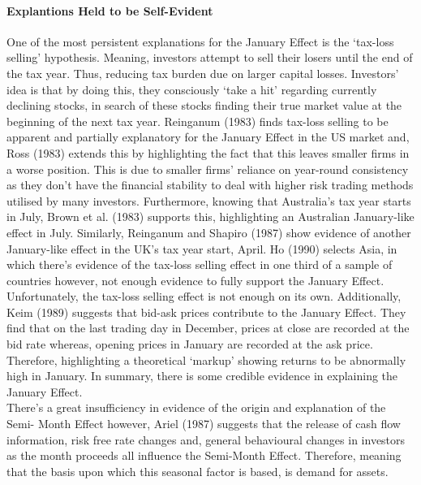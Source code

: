 \documentclass[11pt, english]{article}
\begin{document}
			\paragraph{Explantions Held to be Self-Evident}

			One of the most persistent explanations for the January Effect is the `tax-loss selling' hypothesis. Meaning, investors attempt to sell their losers until the end of the tax year. Thus, reducing tax burden due on larger capital losses. Investors' idea is that by doing this, they consciously `take a hit' regarding currently declining stocks, in search of these stocks finding their true market value at the beginning of the next tax year. Reinganum (1983) finds tax-loss selling to be apparent and partially explanatory for the January Effect in the US market and, Ross (1983) extends this by highlighting the fact that this leaves smaller firms in a worse position. This is due to smaller firms' reliance on year-round consistency as they don’t have the financial stability to deal with higher risk trading methods utilised by many investors. Furthermore, knowing that Australia’s tax year starts in July, Brown et al. (1983) supports this, highlighting an Australian January-like effect in July. Similarly, Reinganum and Shapiro (1987) show evidence of another January-like effect in the UK’s tax year start, April. Ho (1990) selects Asia, in which there’s evidence of the tax-loss selling effect in one third of a sample of countries however, not enough evidence to fully support the January Effect. Unfortunately, the tax-loss selling effect is not enough on its own. Additionally, Keim (1989) suggests that bid-ask prices contribute to the January Effect. They find that on the last trading day in December, prices at close are recorded at the bid rate whereas, opening prices in January are recorded at the ask price. Therefore, highlighting a theoretical `markup' showing returns to be abnormally high in January. In summary, there is some credible evidence in explaining the January Effect.\\

			There’s a great insufficiency in evidence of the origin and explanation of the Semi- Month Effect however, Ariel (1987) suggests that the release of cash flow information, risk free rate changes and, general behavioural changes in investors as the month proceeds all influence the Semi-Month Effect. Therefore, meaning that the basis upon which this seasonal factor is based, is demand for assets.

	\newpage 
\end{document}
